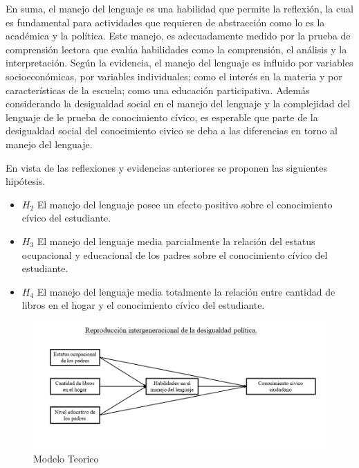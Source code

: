 \documentclass[12pt,twoside]{templates/facsothesis}
\providecommand{\tightlist}{%
  \setlength{\itemsep}{0pt}\setlength{\parskip}{0pt}}
\begin{document}
En suma, el manejo del lenguaje es una habilidad que permite la reflexión, la cual es fundamental para actividades que requieren de abstracción como lo es la académica y la política. Este manejo, es adecuadamente medido por la prueba de comprensión lectora que evalúa habilidades como la comprensión, el análisis y la interpretación. Según la evidencia, el manejo del lenguaje es influido por variables socioeconómicas, por variables individuales; como el interés en la materia y por características de la escuela; como una educación participativa. Además considerando la desigualdad social en el manejo del lenguaje y la complejidad del lenguaje de le prueba de conocimiento cívico, es esperable que parte de la desigualdad social del conocimiento civico se deba a las diferencias en torno al manejo del lenguaje.

En vista de las reflexiones y evidencias anteriores se proponen las siguientes hipótesis.

\begin{itemize}
\tightlist
\item
  \(H_2\) El manejo del lenguaje posee un efecto positivo sobre el conocimiento cívico del estudiante.
\item
  \(H_3\) El manejo del lenguaje media parcialmente la relación del estatus ocupacional y educacional de los padres sobre el conocimiento cívico del estudiante.
\item
  \(H_4\) El manejo del lenguaje media totalmente la relación entre cantidad de libros en el hogar y el conocimiento cívico del estudiante.
\end{itemize}

\begin{figure}

{\centering \includegraphics[width=0.95\linewidth]{images/modelo} 

}

\caption{Modelo Teorico}\label{fig:unnamed-chunk-3}
\end{figure}
\end{document}
